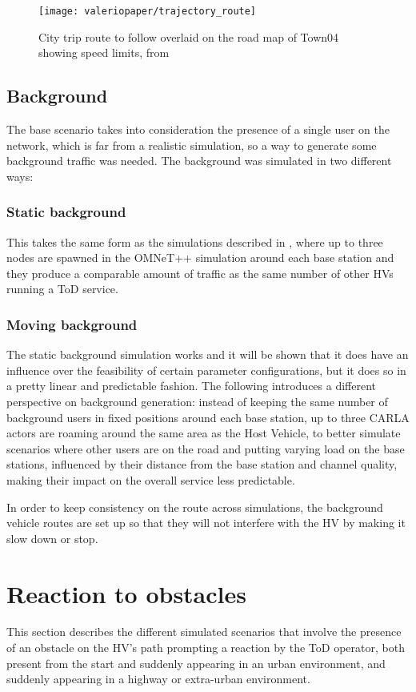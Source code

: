 \begin{figure}[h]
    \centering
    \texttt{[image: valeriopaper/trajectory\_route]}
    \caption{City trip route to follow overlaid on the road map of Town04 showing speed limits, from \cite{valeriopaper}}
    \label{fig:valerios_sim_trajectory_route}
\end{figure}

\subsection{Background}
\label{subsec:scenarios:city_trip:background}
The base scenario takes into consideration the presence of a single user on the network, which is far from a realistic simulation, so a way to generate some background traffic was needed.
The background was simulated in two different ways:
\subsubsection{Static background}
This takes the same form as the simulations described in \cite{valeriopaper}, where up to three nodes are spawned in the OMNeT++ simulation around each base station and they produce a comparable amount of traffic as the same number of other HVs running a ToD service.

\subsubsection{Moving background}
The static background simulation works and it will be shown that it does have an influence over the feasibility of certain parameter configurations, but it does so in a pretty linear and predictable fashion. The following introduces a different perspective on background generation: instead of keeping the same number of background users in fixed positions around each base station, up to three CARLA actors are roaming around the same area as the Host Vehicle, to better simulate scenarios where other users are on the road and putting varying load on the base stations, influenced by their distance from the base station and channel quality, making their impact on the overall service less predictable.

In order to keep consistency on the route across simulations, the background vehicle routes are set up so that they will not interfere with the HV by making it slow down or stop.


\section{Reaction to obstacles}
This section describes the different simulated scenarios that involve the presence of an obstacle on the HV's path prompting a reaction by the ToD operator, both present from the start and suddenly appearing in an urban environment, and suddenly appearing in a highway or extra-urban environment.

